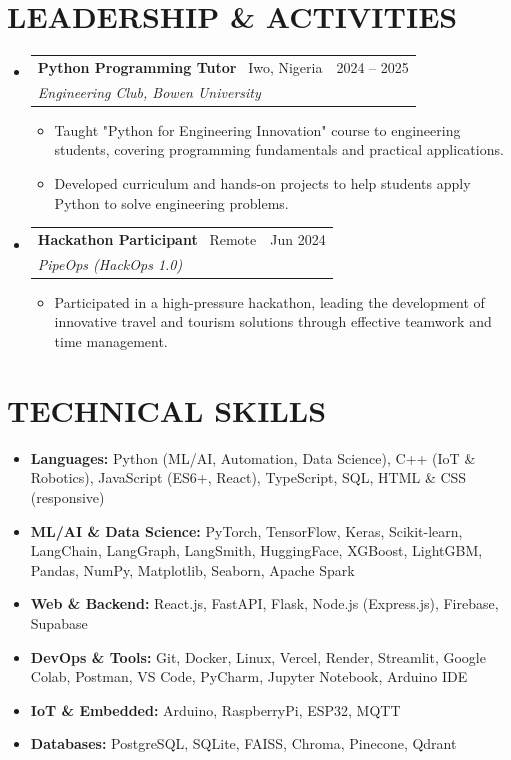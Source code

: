 \documentclass[11pt,a4paper]{article}
\makeatletter
\newcommand{\resumeSubheading}[5]{
  \vspace{2pt}
  \item[]
    \begin{tabular*}{\textwidth}[t]{l@{\extracolsep{\fill}}r}
      \textbf{#1} \textnormal{ \textbar\ #4} & #2 \\ %
      \textit{#3} & \\ %
    \end{tabular*}
    #5
  \vspace{-8pt}
}
\makeatother
\begin{document}
\section{LEADERSHIP \& ACTIVITIES}

\begin{itemize}[leftmargin=0pt, label={}]

\resumeSubheading
  {Python Programming Tutor}{2024 -- 2025}
  {Engineering Club, Bowen University}{Iwo, Nigeria}
  {
  \begin{itemize}[leftmargin=15pt, label=\textbullet]
    \item Taught "Python for Engineering Innovation" course to engineering students, covering programming fundamentals and practical applications.
    \item Developed curriculum and hands-on projects to help students apply Python to solve engineering problems.
  \end{itemize}
  }

\resumeSubheading
  {Hackathon Participant}{Jun 2024}
  {PipeOps (HackOps 1.0)}{Remote}
  {
  \begin{itemize}[leftmargin=15pt, label=\textbullet]
    \item Participated in a high-pressure hackathon, leading the development of innovative travel and tourism solutions through effective teamwork and time management.
  \end{itemize}
  }

\end{itemize}

\section{TECHNICAL SKILLS}

\begin{itemize}[leftmargin=0pt, label={}]
\item \textbf{Languages:} Python (ML/AI, Automation, Data Science), C++ (IoT \& Robotics), JavaScript (ES6+, React), TypeScript, SQL, HTML \& CSS (responsive)

\item \textbf{ML/AI \& Data Science:} PyTorch, TensorFlow, Keras, Scikit-learn, LangChain, LangGraph, LangSmith, HuggingFace, XGBoost, LightGBM, Pandas, NumPy, Matplotlib, Seaborn, Apache Spark

\item \textbf{Web \& Backend:} React.js, FastAPI, Flask, Node.js (Express.js), Firebase, Supabase

\item \textbf{DevOps \& Tools:} Git, Docker, Linux, Vercel, Render, Streamlit, Google Colab, Postman, VS Code, PyCharm, Jupyter Notebook, Arduino IDE

\item \textbf{IoT \& Embedded:} Arduino, RaspberryPi, ESP32, MQTT

\item \textbf{Databases:} PostgreSQL, SQLite, FAISS, Chroma, Pinecone, Qdrant
\end{itemize}
\end{document}
